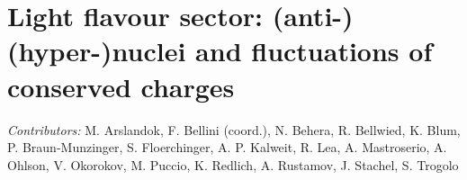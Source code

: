 \documentclass[../report.tex]{subfiles}
\providecommand{\main}{..}
\begin{document}
\clearpage
\section{Light flavour sector: (anti-)(hyper-)nuclei and fluctuations of conserved charges}

\textit{Contributors:} M. Arslandok, F. Bellini (coord.), N. Behera, R. Bellwied, K. Blum, P. Braun-Munzinger, S. Floerchinger, A. P. Kalweit, R. Lea, A. Mastroserio, A. Ohlson, V. Okorokov, M. Puccio,  K. Redlich, A. Rustamov, J. Stachel, S. Trogolo






\end{document}
